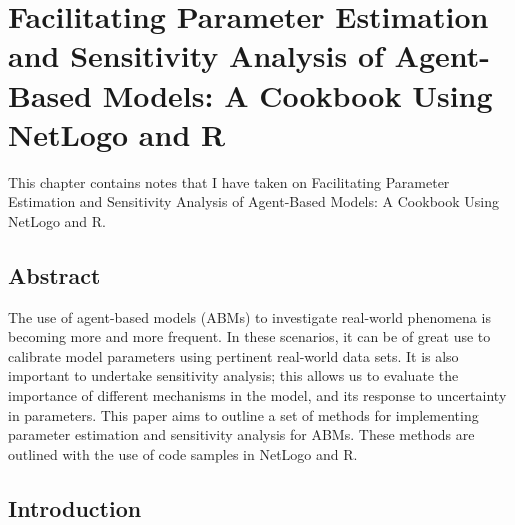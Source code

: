 \chapter{Facilitating Parameter Estimation and Sensitivity Analysis of Agent-Based Models: A Cookbook Using NetLogo and R}
\label{ch:thiele_kurther_grimm}

This chapter contains notes that I have taken on Facilitating Parameter Estimation and Sensitivity Analysis of Agent-Based Models: A Cookbook Using NetLogo and R\citep{thiele_facilitating_2014}.

\section*{Abstract}
\label{thiele:absract}

The use of agent-based models (ABMs) to investigate real-world phenomena is becoming more and more frequent.
In these scenarios, it can be of great use to calibrate model parameters using pertinent real-world data sets.
It is also important to undertake sensitivity analysis; this allows us to evaluate the importance of different mechanisms in the model, and its response to uncertainty in parameters.
This paper aims to outline a set of methods for implementing parameter estimation and sensitivity analysis for ABMs.
These methods are outlined with the use of code samples in NetLogo and R.

\section{Introduction}
\label{thiele:introduction}

